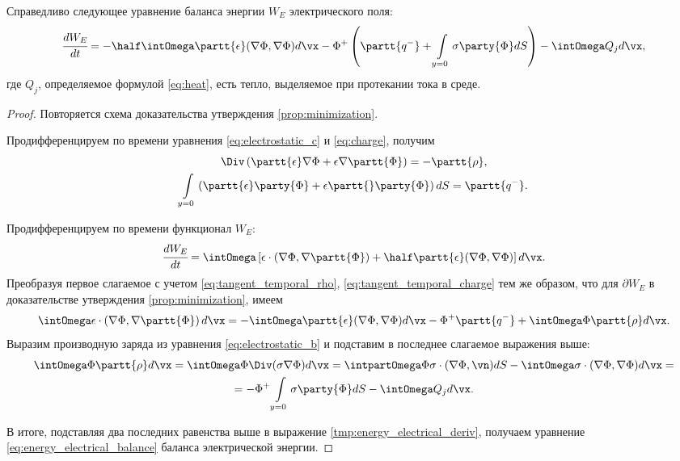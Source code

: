 \begin{proposition}
\label{prop:energy_electrical_balance}
Справедливо следующее уравнение баланса энергии $W_E$ электрического поля:
\begin{equation}
    \cfrac{d W_E}{dt} = -\half \intOmega \partt{\epsilon} (\nabla \Phi, \nabla \Phi) d \vx - \Phi^+ \left( \partt{q^-} + \int\limits_{y = 0} \sigma \party{\Phi} dS \right) - \intOmega Q_j d \vx,
    \label{eq:energy_electrical_balance}
\end{equation}
где $Q_j$, определяемое формулой \eqref{eq:heat}, есть тепло, выделяемое при протекании тока в среде.
\end{proposition}
\begin{proof}
Повторяется схема доказательства утверждения \ref{prop:minimization}.

Продифференцируем по времени уравнения \eqref{eq:electrostatic_c} и \eqref{eq:charge}, получим
\begin{gather}
    \Div \left( \partt{\epsilon} \nabla \Phi + \epsilon \nabla \partt{\Phi} \right) = -\partt{\rho},
    \label{eq:tangent_temporal_rho} \\
    \int\limits_{y = 0} \left( \partt{\epsilon} \party{\Phi} + \epsilon \partt{} \party{\Phi} \right) dS = \partt{q^-}.
    \label{eq:tangent_temporal_charge}
\end{gather}

Продифференцируем по времени функционал $W_E$:
\begin{equation}
    \cfrac{d W_E}{dt} = \intOmega \left[ \epsilon \cdot \left( \nabla \Phi, \nabla \partt{\Phi} \right) + \half \partt{\epsilon} (\nabla \Phi, \nabla \Phi) \right] d \vx.
    \label{tmp:energy_electrical_deriv}
\end{equation}
Преобразуя первое слагаемое с учетом \eqref{eq:tangent_temporal_rho}, \eqref{eq:tangent_temporal_charge} тем же образом, что для $\partial W_E$ в доказательстве утверждения \ref{prop:minimization}, имеем
\begin{equation}
    \intOmega \epsilon \cdot \left( \nabla \Phi, \nabla \partt{\Phi} \right) d \vx = -\intOmega \partt{\epsilon} (\nabla \Phi, \nabla \Phi) d \vx - \Phi^+ \partt{q^-} + \intOmega \Phi \partt{\rho} d \vx.
    \label{tmp:energy_electrical_deriv_first}
\end{equation}
Выразим производную заряда из уравнения \eqref{eq:electrostatic_b} и подставим в последнее слагаемое выражения выше:
\begin{multline*}
    \intOmega \Phi \partt{\rho} d \vx = \intOmega \Phi \Div (\sigma \nabla \Phi) d \vx = \intpartOmega \Phi \sigma \cdot (\nabla \Phi, \vn) dS - \intOmega \sigma \cdot (\nabla \Phi, \nabla \Phi) d \vx = \\ = -\Phi^+ \int\limits_{y = 0} \sigma \party{\Phi} dS - \intOmega Q_j d \vx.
\end{multline*}

В итоге, подставляя два последних равенства выше в выражение \eqref{tmp:energy_electrical_deriv}, получаем уравнение \eqref{eq:energy_electrical_balance} баланса электрической энергии.
\end{proof}

